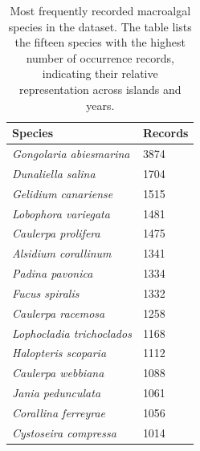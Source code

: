 \documentclass[a4paper,fleqn]{cas-sc}
\begin{document}
\begin{table}[width=\linewidth,cols=2,pos=h]
\caption{Most frequently recorded macroalgal species in the dataset. The table lists the fifteen species with the highest number of occurrence records, indicating their relative representation across islands and years.}
\small
\begin{tabular*}{\tblwidth}{@{} LL @{}}
\toprule
Species & Records \\
\midrule
\textit{Gongolaria abiesmarina} & 3874 \\
\textit{Dunaliella salina} & 1704 \\
\textit{Gelidium canariense} & 1515 \\
\textit{Lobophora variegata} & 1481 \\
\textit{Caulerpa prolifera} & 1475 \\
\textit{Alsidium corallinum} & 1341 \\
\textit{Padina pavonica} & 1334 \\
\textit{Fucus spiralis} & 1332 \\
\textit{Caulerpa racemosa} & 1258 \\
\textit{Lophocladia trichoclados} & 1168 \\
\textit{Halopteris scoparia} & 1112 \\
\textit{Caulerpa webbiana} & 1088 \\
\textit{Jania pedunculata} & 1061 \\
\textit{Corallina ferreyrae} & 1056 \\
\textit{Cystoseira compressa} & 1014 \\
\bottomrule
\end{tabular*}
\label{tab:3}
\end{table}
\FloatBarrier
\end{document}
